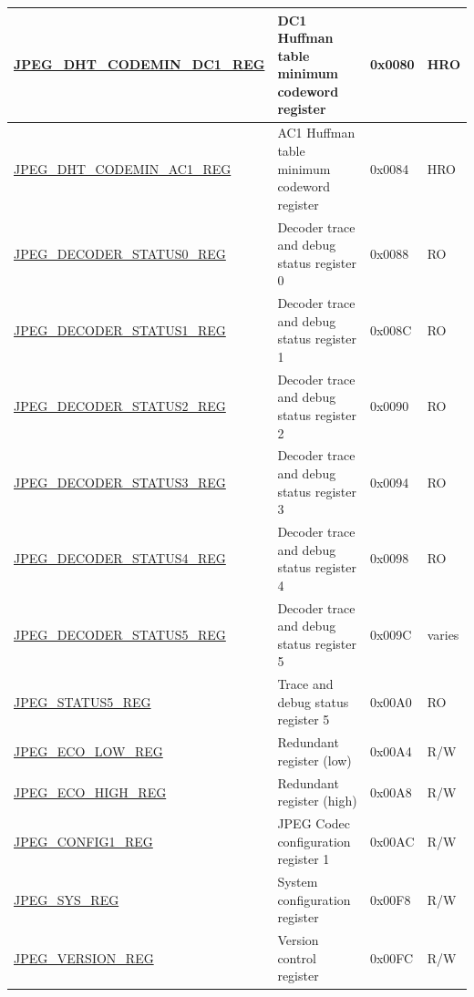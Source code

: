 \begin{longtable}{ | p{6cm} | p{6.8cm} | p{1.3cm} | p{1.4cm} | }
\hyperref[regdesc:JPEGDHTCODEMINDC1REG]{JPEG\_DHT\_CODEMIN\_DC1\_REG} & DC1 Huffman table minimum codeword register & 0x0080 & HRO \\ \hline
\hyperref[regdesc:JPEGDHTCODEMINAC1REG]{JPEG\_DHT\_CODEMIN\_AC1\_REG} & AC1 Huffman table minimum codeword register & 0x0084 & HRO \\ \hline
\hyperref[regdesc:JPEGDECODERSTATUS0REG]{JPEG\_DECODER\_STATUS0\_REG} & Decoder trace and debug status register 0 & 0x0088 & RO \\ \hline
\hyperref[regdesc:JPEGDECODERSTATUS1REG]{JPEG\_DECODER\_STATUS1\_REG} & Decoder trace and debug status register 1 & 0x008C & RO \\ \hline
\hyperref[regdesc:JPEGDECODERSTATUS2REG]{JPEG\_DECODER\_STATUS2\_REG} & Decoder trace and debug status register 2 & 0x0090 & RO \\ \hline
\hyperref[regdesc:JPEGDECODERSTATUS3REG]{JPEG\_DECODER\_STATUS3\_REG} & Decoder trace and debug status register 3 & 0x0094 & RO \\ \hline
\hyperref[regdesc:JPEGDECODERSTATUS4REG]{JPEG\_DECODER\_STATUS4\_REG} & Decoder trace and debug status register 4 & 0x0098 & RO \\ \hline
\hyperref[regdesc:JPEGDECODERSTATUS5REG]{JPEG\_DECODER\_STATUS5\_REG} & Decoder trace and debug status register 5 & 0x009C & varies \\ \hline
\hyperref[regdesc:JPEGSTATUS5REG]{JPEG\_STATUS5\_REG} & Trace and debug status register 5 & 0x00A0 & RO \\ \hline
\hyperref[regdesc:JPEGECOLOWREG]{JPEG\_ECO\_LOW\_REG} & Redundant register (low) & 0x00A4 & R/W \\ \hline
\hyperref[regdesc:JPEGECOHIGHREG]{JPEG\_ECO\_HIGH\_REG} & Redundant register (high) & 0x00A8 & R/W \\ \hline
\hyperref[regdesc:JPEGCONFIG1REG]{JPEG\_CONFIG1\_REG} & JPEG Codec configuration register 1 & 0x00AC & R/W \\ \hline
\hyperref[regdesc:JPEGSYSREG]{JPEG\_SYS\_REG} & System configuration register & 0x00F8 & R/W \\ \hline
\hyperref[regdesc:JPEGVERSIONREG]{JPEG\_VERSION\_REG} & Version control register & 0x00FC & R/W \\ \hline
\end{longtable}
